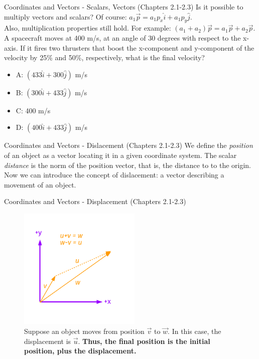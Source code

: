 \documentclass{beamer}
\begin{document}
\begin{frame}{Coordinates and Vectors - Scalars, Vectors (Chapters 2.1-2.3)}
Is it possible to multiply vectors and scalars?  Of course: $a_1\vec{p} = a_1p_x\hat{i}+a_1p_y\hat{j}$.\\
\vspace{0.2cm}
Also, multiplication properties still hold.  For example: $(a_1+a_2)\vec{p} = a_1\vec{p}+a_2\vec{p}$. \\
\vspace{0.2cm}
\small
A spacecraft moves at 400 m/s, at an angle of 30 degrees with respect to the x-axis.  If it fires two thrusters that boost the x-component and y-component of the velocity by 25\% and 50\%, respectively, what is the final velocity?
\begin{itemize}
\item A: $(433\hat{i}+300\hat{j})$ m/s
\item B: $(300\hat{i}+433\hat{j})$ m/s
\item C: 400 m/s
\item D: $(400\hat{i}+433\hat{j})$ m/s
\end{itemize}
\end{frame}

\begin{frame}{Coordinates and Vectors - Dislacement (Chapters 2.1-2.3)}
We define the \textit{position} of an object as a vector locating it in a given coordinate system.  The scalar \textit{distance} is the norm of the position vector, that is, the distance to to the origin. \\
\vspace{0.5cm}
Now we can introduce the concept of \alert{dislacement}: a vector describing a movement of an object.
\end{frame}

\begin{frame}{Coordinates and Vectors - Displacement (Chapters 2.1-2.3)}
\begin{figure}
\centering
\includegraphics[width=0.52\textwidth]{figures/Vectors4.pdf}
\caption{\label{fig:displacement} Suppose an object moves from position $\vec{v}$ to $\vec{w}$.  In this case, the \alert{displacement} is $\vec{u}$. \textbf{Thus, the final position is the initial position, plus the displacement.}}
\end{figure}
\end{frame}
\end{document}
